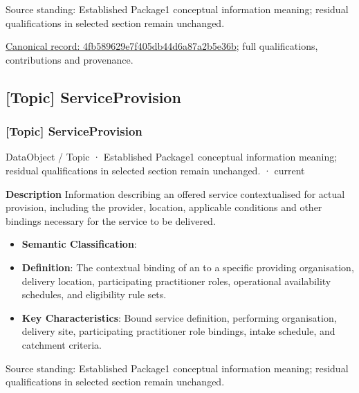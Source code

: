 Source standing: Established Package1 conceptual information meaning; residual qualifications in selected section remain unchanged.


{\footnotesize \href{../../../../continuum/application/data-object/topic/4fb589629e7f405db44d6a87a2b5e36b.md}{Canonical record: 4fb589629e7f405db44d6a87a2b5e36b}; full qualifications, contributions and provenance.}\par
\subsection{[Topic] ServiceProvision}

\subsubsection{[Topic] ServiceProvision}

\label{element:8d41e9fb6a164deb93afb5fc4c671e10}
{\small DataObject / Topic · Established Package1 conceptual information meaning; residual qualifications in selected section remain unchanged. · current}\par

\textbf{Description}
Information describing an offered service contextualised for actual provision, including the provider, location, applicable conditions and other bindings necessary for the service to be delivered.



\begin{itemize}


\item \textbf{Semantic Classification}: \texttt{}

\item \textbf{Definition}: The contextual binding of an \texttt{} to a specific providing organisation, delivery location, participating practitioner roles, operational availability schedules, and eligibility rule sets.

\item \textbf{Key Characteristics}: Bound service definition, performing organisation, delivery site, participating practitioner role bindings, intake schedule, and catchment criteria.

\end{itemize}


Source standing: Established Package1 conceptual information meaning; residual qualifications in selected section remain unchanged.


